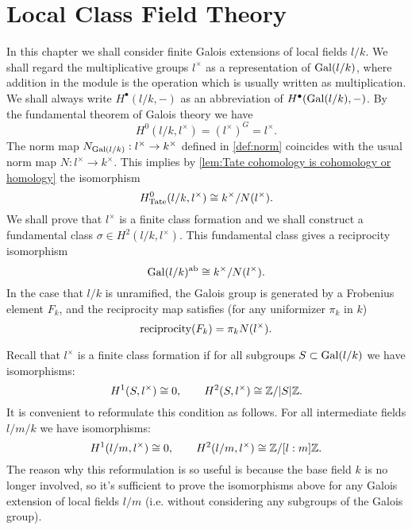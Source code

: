 \chapter{Local Class Field Theory}

In this chapter we shall consider finite Galois extensions of local fields $l/k$.
We shall regard the multiplicative groups $l^\times$ as a representation of $\mathrm{Gal}(l/k)$, where
addition in the module is the operation which is usually written as multiplication.
We shall always write $H^\bullet(l/k,-)$ as an abbreviation of $H^\bullet(\mathrm{Gal}(l/k),-)$.
By the fundamental theorem of Galois theory we have
\[
	H^0(l/k,l^\times) = (l^\times)^G = l^\times.
\]
The norm map $N_{\mathrm{Gal}(l/k)} : l^\times \to k^\times$ defined in \ref{def:norm}
coincides with the usual norm map $N : l^\times \to k^\times$. This implies by
\ref{lem:Tate cohomology is cohomology or homology} the isomorphism
\[
	H^0_{\mathrm{Tate}}(l/k,l^\times) \cong k^\times / N(l^\times).
\]
We shall prove that $l^\times$ is a finite class formation and we shall construct a
fundamental class $\sigma \in H^2(l/k, l^\times)$.
This fundamental class gives a reciprocity isomorphism
\[
	\mathrm{Gal}(l/k)^{\mathrm{ab}}
	\cong
	k^\times / N(l^\times).
\]
In the case that $l/k$ is unramified, the Galois group is generated by a Frobenius element $F_k$,
and the reciprocity map satisfies (for any uniformizer $\pi_k$ in $k$)
\[
	\mathrm{reciprocity}(F_k) = \pi_k N(l^\times).
\]

Recall that $l^\times$ is a finite class formation if for all subgroups $S \subset \mathrm{Gal}(l/k)$
we have isomorphisms:
\[
	H^1(S,l^\times) \cong 0, \qquad H^2(S,l^\times) \cong {\mathbb Z} / |S| {\mathbb Z}.
\]
It is convenient to reformulate this condition as follows. For all intermediate fields $l / m / k$
we have isomorphisms:
\[
	H^1(l/m,l^\times) \cong 0, \qquad H^2(l/m,l^\times) \cong {\mathbb Z} / [l:m] {\mathbb Z}.
\]
The reason why this reformulation is so useful is because the base field $k$ is no longer involved,
so it's sufficient to prove the isomorphisms above for any Galois extension of local fields $l/m$
(i.e. without considering any subgroups of the Galois group).

